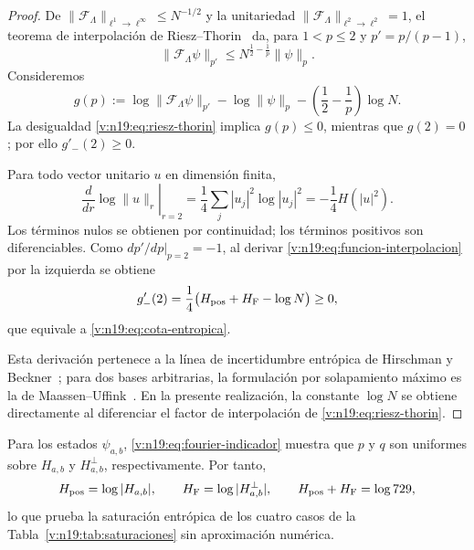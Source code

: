 \begin{proof}
De \(\|\mathcal F_\Lambda\|_{\ell^1\to\ell^\infty}
\le N^{-1/2}\) y la unitariedad
\(\|\mathcal F_\Lambda\|_{\ell^2\to\ell^2}=1\), el teorema de
interpolación de Riesz--Thorin~\cite{riesz_1927,thorin_1948} da, para
\(1<p\le2\) y \(p'=p/(p-1)\),
\begin{equation}
 \|\mathcal F_\Lambda\psi\|_{p'}
 \le N^{\frac12-\frac1p}\|\psi\|_p.
 \label{v:n19:eq:riesz-thorin}
\end{equation}
Consideremos
\begin{equation}
 g(p):=\log\|\mathcal F_\Lambda\psi\|_{p'}
       -\log\|\psi\|_p
       -\left(\frac12-\frac1p\right)\log N.
 \label{v:n19:eq:funcion-interpolacion}
\end{equation}
La desigualdad \eqref{v:n19:eq:riesz-thorin} implica \(g(p)\le0\),
mientras que \(g(2)=0\); por ello \(g'_-(2)\ge0\).

Para todo vector unitario \(u\) en dimensión finita,
\begin{equation}
 \left.\frac{d}{dr}\log\|u\|_r\right|_{r=2}
 =\frac14\sum_j|u_j|^2\log|u_j|^2
 =-\frac14H(|u|^2).
 \label{v:n19:eq:derivada-norma}
\end{equation}
Los términos nulos se obtienen por continuidad; los términos positivos
son diferenciables. Como \(\left.dp'/dp\right|_{p=2}=-1\), al derivar
\eqref{v:n19:eq:funcion-interpolacion} por la izquierda se obtiene
\begin{equation}
 g'_-(2)=\frac14
 \bigl(H_{\rm pos}+H_{\rm F}-\log N\bigr)\ge0,
 \label{v:n19:eq:derivada-entropica}
\end{equation}
que equivale a \eqref{v:n19:eq:cota-entropica}.

Esta derivación pertenece a la línea de incertidumbre entrópica de
Hirschman y Beckner~\cite{hirschman_1957,beckner_1975}; para dos bases
arbitrarias, la formulación por solapamiento máximo es la de
Maassen--Uffink~\cite{maassen_uffink_1988}. En la presente realización,
la constante \(\log N\) se obtiene directamente al diferenciar el factor
de interpolación de \eqref{v:n19:eq:riesz-thorin}.
\end{proof}

Para los estados \(\psi_{a,b}\), \eqref{v:n19:eq:fourier-indicador}
muestra que \(p\) y \(q\) son uniformes sobre \(H_{a,b}\) y
\(H_{a,b}^{\perp}\), respectivamente. Por tanto,
\[
 H_{\rm pos}=\log|H_{a,b}|,\qquad
 H_{\rm F}=\log|H_{a,b}^{\perp}|,\qquad
 H_{\rm pos}+H_{\rm F}=\log729,
\]
lo que prueba la saturación entrópica de los cuatro casos de la
Tabla~\ref{v:n19:tab:saturaciones} sin aproximación numérica.

